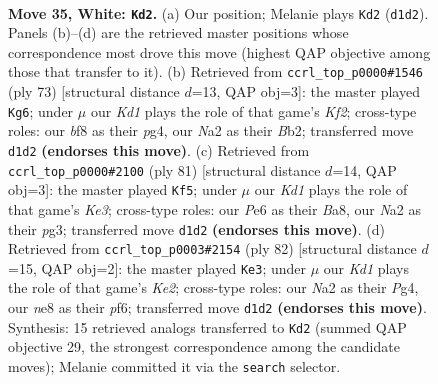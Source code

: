 \documentclass[11pt]{article}
\begin{document}
\clearpage

\begin{figure}[p]\centering
\begin{subfigure}{0.46\textwidth}\centering
\resizebox{\linewidth}{!}{%
\newchessgame
\chessboard[
  setfen={3knb2/8/4P3/2pP4/8/1P4p1/N7/3K4 w - - 0 35},
  showmover=false,
  pgfstyle=straightmove, color=movearrow, markmove={d1-d2}
]}
\caption{}
\end{subfigure}\hfill
\begin{subfigure}{0.46\textwidth}\centering
\resizebox{\linewidth}{!}{%
\newchessgame
\chessboard[
  setfen={8/5k2/7p/6p1/6P1/3P4/1b3P1K/6N1 b - - 1 37},
  showmover=false,
  pgfstyle=straightmove, color=movearrow, markmove={f7-g6}
]}
\caption{}
\end{subfigure}
\\[4pt]
\begin{subfigure}{0.46\textwidth}\centering
\resizebox{\linewidth}{!}{%
\newchessgame
\chessboard[
  setfen={b7/p6p/4k1p1/8/2NK4/6P1/1P5P/8 b - - 6 41},
  showmover=false,
  pgfstyle=straightmove, color=movearrow, markmove={e6-f5}
]}
\caption{}
\end{subfigure}\hfill
\begin{subfigure}{0.46\textwidth}\centering
\resizebox{\linewidth}{!}{%
\newchessgame
\chessboard[
  setfen={8/B4k2/3b1p2/6p1/4P1P1/7P/4K3/8 w - - 5 42},
  showmover=false,
  pgfstyle=straightmove, color=movearrow, markmove={e2-e3}
]}
\caption{}
\end{subfigure}
\caption{\textbf{Move 35, White: \texttt{Kd2}.} (a) Our position; Melanie plays \texttt{Kd2} (\texttt{d1d2}). Panels (b)--(d) are the retrieved master positions whose correspondence most drove this move (highest QAP objective among those that transfer to it). (b) Retrieved from \texttt{ccrl\_top\_p0000\#1546} (ply 73) [structural distance $d$=13, QAP obj=3]: the master played \texttt{Kg6}; under $\mu$ our \emph{Kd1} plays the role of that game's \emph{Kf2}; cross-type roles: our \emph{b}f8 as their \emph{p}g4, our \emph{N}a2 as their \emph{B}b2; transferred move \texttt{d1d2} \textbf{(endorses this move)}. (c) Retrieved from \texttt{ccrl\_top\_p0000\#2100} (ply 81) [structural distance $d$=14, QAP obj=3]: the master played \texttt{Kf5}; under $\mu$ our \emph{Kd1} plays the role of that game's \emph{Ke3}; cross-type roles: our \emph{P}e6 as their \emph{B}a8, our \emph{N}a2 as their \emph{p}g3; transferred move \texttt{d1d2} \textbf{(endorses this move)}. (d) Retrieved from \texttt{ccrl\_top\_p0003\#2154} (ply 82) [structural distance $d$=15, QAP obj=2]: the master played \texttt{Ke3}; under $\mu$ our \emph{Kd1} plays the role of that game's \emph{Ke2}; cross-type roles: our \emph{N}a2 as their \emph{P}g4, our \emph{n}e8 as their \emph{p}f6; transferred move \texttt{d1d2} \textbf{(endorses this move)}. Synthesis: 15 retrieved analogs transferred to \texttt{Kd2} (summed QAP objective 29, the strongest correspondence among the candidate moves); Melanie committed it via the \texttt{search} selector.}
\label{fig:thought-m68}
\end{figure}
\end{document}
